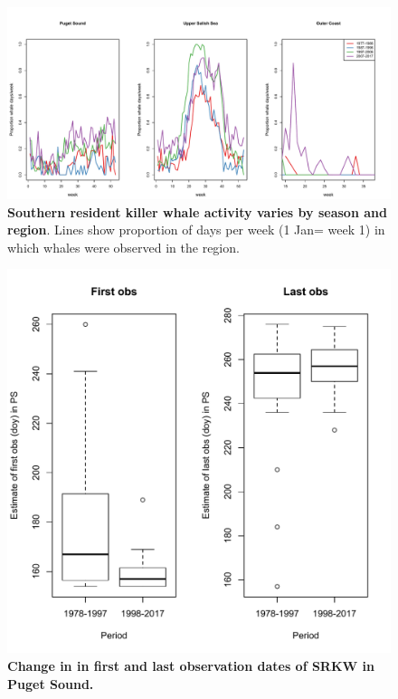 \documentclass{article}
\begin{document}
\begin{figure}[p]
\includegraphics{../analyses/figures/basicplots/propwhdaysperweek.pdf} 
\caption{\textbf{Southern resident killer whale activity varies by season and region}. Lines show proportion of days per week (1 Jan= week 1) in which whales were observed in the region.}
 \label{fig:phenplot2}
 \end{figure} 
\begin{figure}[p]
\includegraphics{../analyses/orcaphen/figures/boxplots_1978_2017_ps.pdf} 
\caption{\textbf{Change in in first and last observation dates of SRKW in Puget Sound.} }
 \label{fig:boxplot1}
 \end{figure}
\end{document}
